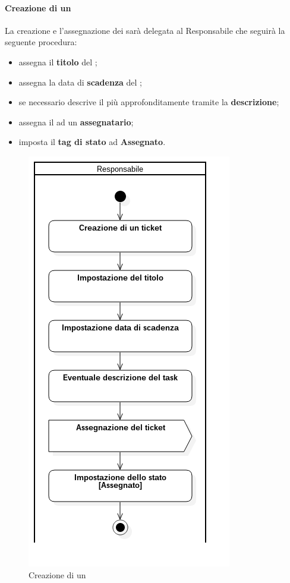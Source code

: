 	\paragraph{Creazione di un }
	\label{sec:4.1.2.1}
		La creazione e l'assegnazione dei  sarà delegata al Responsabile che seguirà la seguente procedura:
		\begin{itemize}
			\item assegna il \textbf{titolo} del ;
			\item assegna la data di \textbf{scadenza} del ;
			\item se necessario descrive il  più approfonditamente tramite la \textbf{descrizione};
			\item assegna il  ad un \textbf{assegnatario};
			\item imposta il \textbf{tag di stato} ad \textbf{Assegnato}.
		\end{itemize}
		\begin{figure}
			\centering
			\includegraphics[scale=0.80]{img/creazioneTicket.png}
			\caption{Creazione di un }
		\end{figure}
